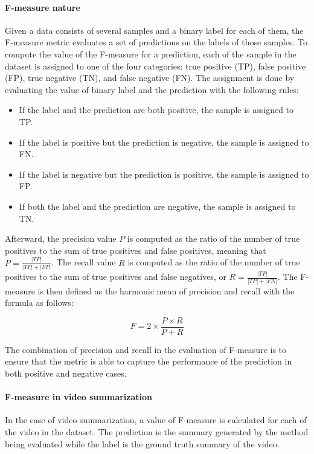         \paragraph[long]{F-measure nature}
            Given a data consists of several samples and a binary label for each of them, the F-measure metric evaluates a set of predictions on the labels of those samples. To compute the value of the F-measure for a prediction, each of the sample in the dataset is assigned to one of the four categories: true positive (TP), false positive (FP), true negative (TN), and false negative (FN). The assignment is done by evaluating the value of binary label and the prediction with the following rules:
            
            \begin{itemize}
                \item If the label and the prediction are both positive, the sample is assigned to TP.
                \item If the label is positive but the prediction is negative, the sample is assigned to FN.
                \item If the label is negative but the prediction is positive, the sample is assigned to FP.
                \item If both the label and the prediction are negative, the sample is assigned to TN.
            \end{itemize}

            Afterward, the precision value $P$ is computed as the ratio of the number of true positives to the sum of true positives and false positives, meaning that $P = \frac{|TP|}{|TP| + |FP|}$. The recall value $R$ is computed as the ratio of the number of true positives to the sum of true positives and false negatives, or $R = \frac{|TP|}{|TP| + |FN|}$. The F-measure is then defined as the harmonic mean of precision and recall with the formula as follows:

            \begin{equation}
                \label{eq:f-measure}
                F = 2 \times \frac{P \times R}{P + R}
            \end{equation}

            The combination of precision and recall in the evaluation of F-measure is to ensure that the metric is able to capture the performance of the prediction in both positive and negative cases. 
        
        \paragraph[long]{F-measure in video summarization}
            In the case of video summarization, a value of F-measure is calculated for each of the video in the dataset. The prediction is the summary generated by the method being evaluated while the label is the ground truth summary of the video.
            
